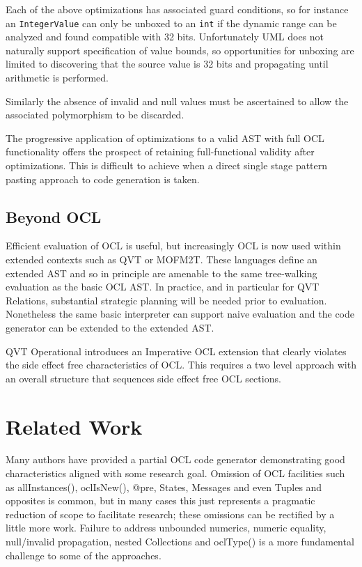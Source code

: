 \documentclass{sig-alternate}
\begin{document}
Each of the above optimizations has associated guard conditions, so for instance an \verb|IntegerValue| can only be unboxed to an \verb|int| if the dynamic range can be analyzed and found compatible with 32 bits. Unfortunately UML does not naturally support specification of value bounds, so opportunities for unboxing are limited to discovering that the source value is 32 bits and propagating until arithmetic is performed.

Similarly the absence of invalid and null values must be ascertained to allow the associated polymorphism to be discarded.

The progressive application of optimizations to a valid AST with full OCL functionality offers the prospect of retaining full-functional validity after optimizations. This is difficult to achieve when a direct single stage pattern pasting approach to code generation is taken. 

\subsection{Beyond OCL}

Efficient evaluation of OCL is useful, but increasingly OCL is now used within extended contexts such as QVT\cite{QVT-1.1} or MOFM2T\cite{MOFM2T}.
These languages define an extended AST and so in principle are amenable to the same tree-walking evaluation as the basic OCL AST. In practice, and in particular for QVT Relations, substantial strategic planning will be needed prior to evaluation. Nonetheless the same basic interpreter can support naive evaluation and the code generator can be extended to the extended AST.

QVT Operational introduces an Imperative OCL extension that clearly violates the side effect free characteristics of OCL.
This requires a two level approach with an overall structure that sequences side effect free
OCL sections.  

\section{Related Work}

Many authors have provided a partial OCL code generator demonstrating good characteristics aligned with some research goal. Omission of OCL facilities such as allInstances(), oclIsNew(), @pre, States, Messages and even Tuples and opposites is common, but in many cases this just represents a pragmatic reduction of scope to facilitate research; these omissions can be rectified by a little more work. Failure to address unbounded numerics, numeric equality, null/invalid propagation, nested Collections and oclType() is a more fundamental challenge to some of the approaches. 
\end{document}

